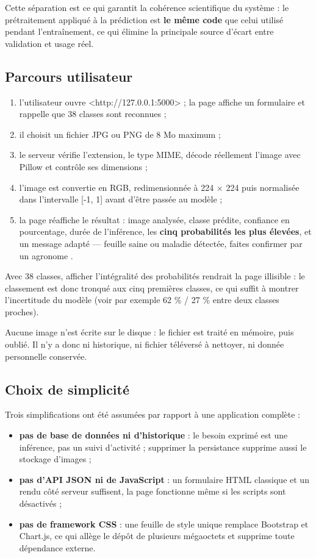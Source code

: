 \documentclass[10pt,a4paper]{article}
\begin{document}
Cette séparation est ce qui garantit la cohérence scientifique du système : le prétraitement appliqué à la prédiction est \textbf{le même code} que celui utilisé pendant l'entraînement, ce qui élimine la principale source d'écart entre validation et usage réel.

\subsection{Parcours utilisateur}

\begin{enumerate}
\item l'utilisateur ouvre <http://127.0.0.1:5000> ; la page affiche un formulaire et rappelle que 38 classes sont reconnues ;
\item il choisit un fichier JPG ou PNG de 8 Mo maximum ;
\item le serveur vérifie l'extension, le type MIME, décode réellement l'image avec Pillow et contrôle ses dimensions ;
\item l'image est convertie en RGB, redimensionnée à 224 $\times$ 224 puis normalisée dans l'intervalle [-1, 1] avant d'être passée au modèle ;
\item la page réaffiche le résultat : image analysée, classe prédite, confiance en pourcentage, durée de l'inférence, les \textbf{cinq probabilités les plus élevées}, et un message adapté --- \guillemotleft{} feuille saine \guillemotright{} ou \guillemotleft{} maladie détectée, faites confirmer par un agronome \guillemotright{}.
\end{enumerate}

Avec 38 classes, afficher l'intégralité des probabilités rendrait la page illisible : le classement est donc tronqué aux cinq premières classes, ce qui suffit à montrer l'incertitude du modèle (voir par exemple 62 \% / 27 \% entre deux classes proches).

Aucune image n'est écrite sur le disque : le fichier est traité en mémoire, puis oublié. Il n'y a donc ni historique, ni fichier téléversé à nettoyer, ni donnée personnelle conservée.

\subsection{Choix de simplicité}

Trois simplifications ont été assumées par rapport à une application \guillemotleft{} complète \guillemotright{} :

\begin{itemize}
\item \textbf{pas de base de données ni d'historique} : le besoin exprimé est une inférence, pas un suivi d'activité ; supprimer la persistance supprime aussi le stockage d'images ;
\item \textbf{pas d'API JSON ni de JavaScript} : un formulaire HTML classique et un rendu côté serveur suffisent, la page fonctionne même si les scripts sont désactivés ;
\item \textbf{pas de framework CSS} : une feuille de style unique remplace Bootstrap et Chart.js, ce qui allège le dépôt de plusieurs mégaoctets et supprime toute dépendance externe.
\end{itemize}
\end{document}
